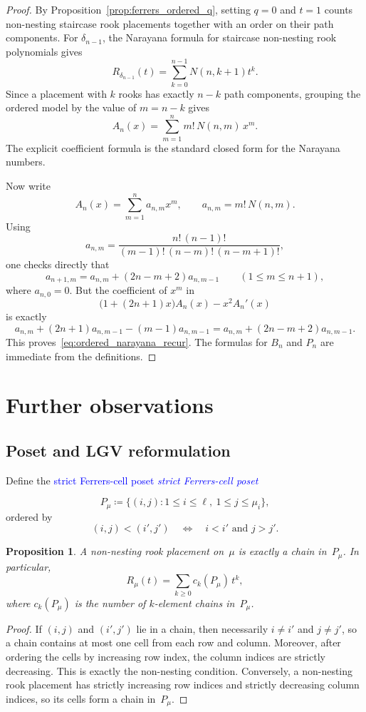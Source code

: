 \documentclass[11pt,reqno]{amsart}
\newtheorem{proposition}[theorem]{Proposition}
\theoremstyle{definition}
\newcommand{\defin}[1]{%
\relax\ifmmode%
\textcolor{blue}{#1}%
\else \textcolor{blue}{\emph{#1}}%
\fi%
}
\begin{document}
\begin{proof}
By Proposition~\ref{prop:ferrers_ordered_q}, setting $q=0$ and $t=1$ counts
non-nesting staircase rook placements together with an order on their path
components. For $\delta_{n-1}$, the Narayana formula for staircase
non-nesting rook polynomials gives
\[
  R_{\delta_{n-1}}(t)
  =
  \sum_{k=0}^{n-1} N(n,k+1)t^k.
\]
Since a placement with $k$ rooks has exactly $n-k$ path components,
grouping the ordered model by the value of $m=n-k$ gives
\[
  A_n(x)
  =
  \sum_{m=1}^{n} m!\,N(n,m)\,x^m.
\]
The explicit coefficient formula is the standard closed form for the Narayana
numbers.

Now write
\[
  A_n(x)=\sum_{m=1}^{n} a_{n,m}x^m,
  \qquad
  a_{n,m}=m!\,N(n,m).
\]
Using
\[
  a_{n,m}
  =
  \frac{n!\,(n-1)!}{(m-1)!\,(n-m)!\,(n-m+1)!},
\]
one checks directly that
\[
  a_{n+1,m}
  =
  a_{n,m} + (2n-m+2)a_{n,m-1}
  \qquad (1 \leq m \leq n+1),
\]
where $a_{n,0}=0$.
But the coefficient of $x^m$ in
\[
  \bigl(1+(2n+1)x\bigr)A_n(x)-x^2A_n'(x)
\]
is exactly
\[
  a_{n,m} + (2n+1)a_{n,m-1} - (m-1)a_{n,m-1}
  =
  a_{n,m} + (2n-m+2)a_{n,m-1}.
\]
This proves~\eqref{eq:ordered_narayana_recur}. The formulas for $B_n$ and
$P_n$ are immediate from the definitions.
\end{proof}

\section{Further observations}

\subsection{Poset and LGV reformulation}

Define the \defin{strict Ferrers-cell poset}
\[
  P_\mu
  \coloneqq
  \{(i,j) : 1 \leq i \leq \ell,\ 1 \leq j \leq \mu_i\},
\]
ordered by
\[
  (i,j) < (i',j')
  \quad\Longleftrightarrow\quad
  i < i' \text{ and } j > j'.
\]

\begin{proposition}\label{prop:poset}
A non-nesting rook placement on~$\mu$ is exactly a chain in~$P_\mu$.
In particular,
\[
  R_\mu(t)
  = \sum_{k \geq 0} c_k(P_\mu)\, t^k,
\]
where $c_k(P_\mu)$ is the number of $k$-element chains in~$P_\mu$.
\end{proposition}
\begin{proof}
If $(i,j)$ and $(i',j')$ lie in a chain, then necessarily $i \neq i'$ and
$j \neq j'$, so a chain contains at most one cell from each row and column.
Moreover, after ordering the cells by increasing row index,
the column indices are strictly decreasing.
This is exactly the non-nesting condition.
Conversely, a non-nesting rook placement has strictly increasing row indices
and strictly decreasing column indices, so its cells form a chain in~$P_\mu$.
\end{proof}
\end{document}
